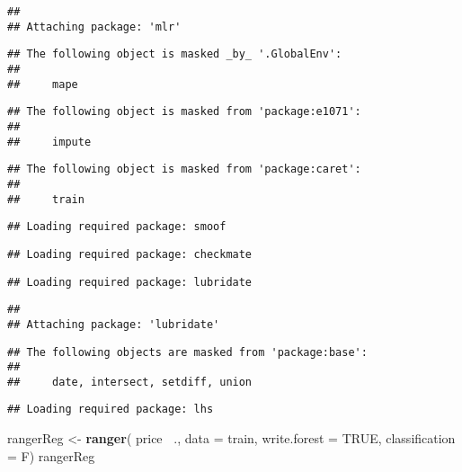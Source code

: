 \documentclass[
]{article}
\newenvironment{Shaded}{\begin{snugshade}}{\end{snugshade}}
\newcommand{\DataTypeTok}[1]{\textcolor[rgb]{0.13,0.29,0.53}{#1}}
\newcommand{\KeywordTok}[1]{\textcolor[rgb]{0.13,0.29,0.53}{\textbf{#1}}}
\newcommand{\NormalTok}[1]{#1}
\newcommand{\OperatorTok}[1]{\textcolor[rgb]{0.81,0.36,0.00}{\textbf{#1}}}
\newcommand{\OtherTok}[1]{\textcolor[rgb]{0.56,0.35,0.01}{#1}}
\newcommand{\StringTok}[1]{\textcolor[rgb]{0.31,0.60,0.02}{#1}}
\begin{document}
\begin{verbatim}
## 
## Attaching package: 'mlr'
\end{verbatim}

\begin{verbatim}
## The following object is masked _by_ '.GlobalEnv':
## 
##     mape
\end{verbatim}

\begin{verbatim}
## The following object is masked from 'package:e1071':
## 
##     impute
\end{verbatim}

\begin{verbatim}
## The following object is masked from 'package:caret':
## 
##     train
\end{verbatim}

\begin{verbatim}
## Loading required package: smoof
\end{verbatim}

\begin{verbatim}
## Loading required package: checkmate
\end{verbatim}

\begin{verbatim}
## Loading required package: lubridate
\end{verbatim}

\begin{verbatim}
## 
## Attaching package: 'lubridate'
\end{verbatim}

\begin{verbatim}
## The following objects are masked from 'package:base':
## 
##     date, intersect, setdiff, union
\end{verbatim}

\begin{verbatim}
## Loading required package: lhs
\end{verbatim}

\begin{Shaded}
\begin{Highlighting}[]
\NormalTok{rangerReg <-}\StringTok{ }\KeywordTok{ranger}\NormalTok{( price}\OperatorTok{~}\StringTok{ }\NormalTok{., }\DataTypeTok{data =}\NormalTok{ train, }\DataTypeTok{write.forest =} \OtherTok{TRUE}\NormalTok{, }\DataTypeTok{classification =}\NormalTok{ F)}
\NormalTok{rangerReg}
\end{Highlighting}
\end{Shaded}
\end{document}
